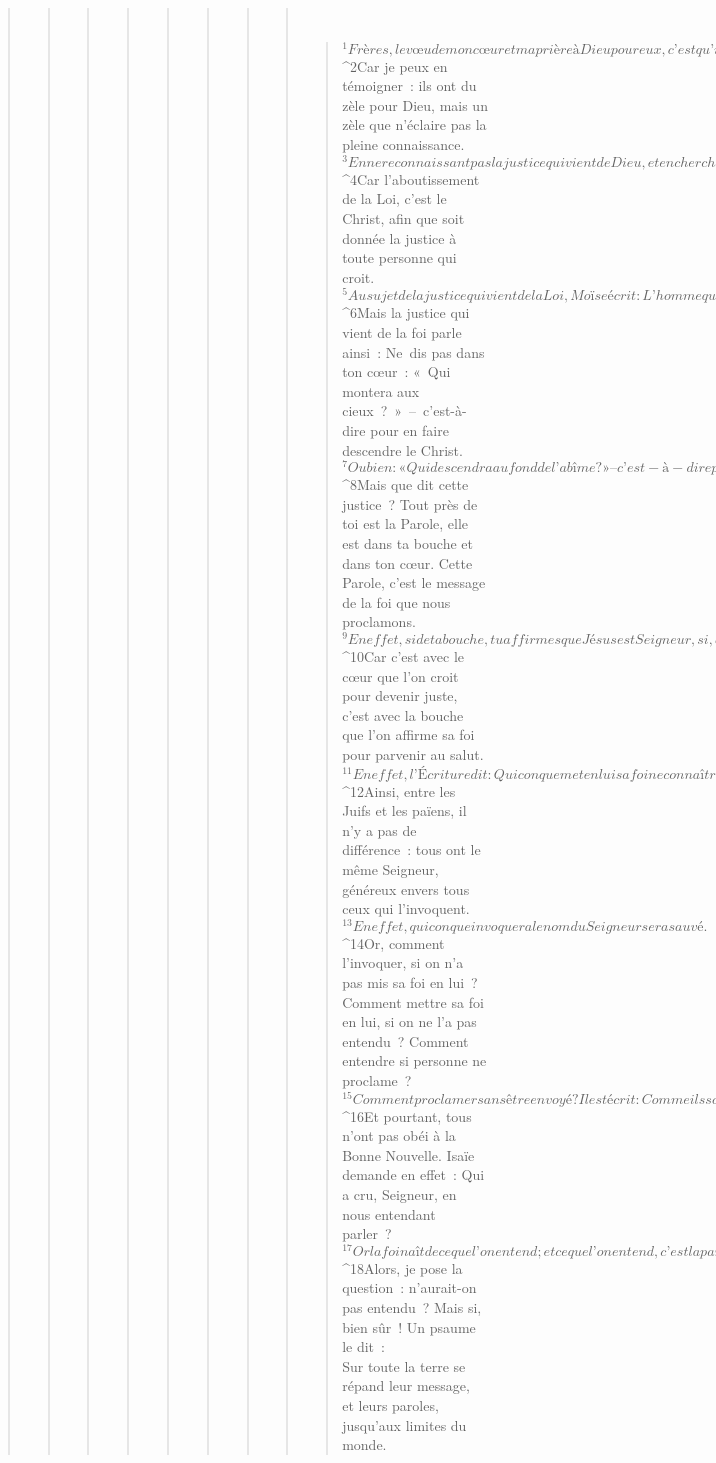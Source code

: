 \begin{verse}
\begin{verse}
\begin{verse}
\begin{verse}
\begin{verse}
\begin{verse}
\begin{verse}
\begin{verse}
         
      \bchapter{}
      \begin{verse}
${}^{1}Frères, le vœu de mon cœur et ma prière à Dieu pour eux, c’est qu’ils obtiennent le salut. 
${}^{2}Car je peux en témoigner : ils ont du zèle pour Dieu, mais un zèle que n’éclaire pas la pleine connaissance. 
${}^{3}En ne reconnaissant pas la justice qui vient de Dieu, et en cherchant à instaurer leur propre justice, ils ne se sont pas soumis à la justice de Dieu. 
${}^{4}Car l’aboutissement de la Loi, c’est le Christ, afin que soit donnée la justice à toute personne qui croit. 
${}^{5}Au sujet de la justice qui vient de la Loi, Moïse écrit : L’homme qui mettra les commandements en pratique y trouvera la vie.
${}^{6}Mais la justice qui vient de la foi parle ainsi : Ne dis pas dans ton cœur : « Qui montera aux cieux ? » – c’est-à-dire pour en faire descendre le Christ.
${}^{7}Ou bien : « Qui descendra au fond de l’abîme ? » – c’est-à-dire pour faire remonter le Christ d’entre les morts.
${}^{8}Mais que dit cette justice ? Tout près de toi est la Parole, elle est dans ta bouche et dans ton cœur. Cette Parole, c’est le message de la foi que nous proclamons.
${}^{9}En effet, si de ta bouche, tu affirmes que Jésus est Seigneur, si, dans ton cœur, tu crois que Dieu l’a ressuscité d’entre les morts, alors tu seras sauvé. 
${}^{10}Car c’est avec le cœur que l’on croit pour devenir juste, c’est avec la bouche que l’on affirme sa foi pour parvenir au salut. 
${}^{11}En effet, l’Écriture dit : Quiconque met en lui sa foi ne connaîtra pas la honte.
${}^{12}Ainsi, entre les Juifs et les païens, il n’y a pas de différence : tous ont le même Seigneur, généreux envers tous ceux qui l’invoquent. 
${}^{13}En effet, quiconque invoquera le nom du Seigneur sera sauvé.
${}^{14}Or, comment l’invoquer, si on n’a pas mis sa foi en lui ? Comment mettre sa foi en lui, si on ne l’a pas entendu ? Comment entendre si personne ne proclame ? 
${}^{15}Comment proclamer sans être envoyé ? Il est écrit : Comme ils sont beaux, les pas des messagers qui annoncent les bonnes nouvelles!
${}^{16}Et pourtant, tous n’ont pas obéi à la Bonne Nouvelle. Isaïe demande en effet : Qui a cru, Seigneur, en nous entendant parler ? 
${}^{17}Or la foi naît de ce que l’on entend ; et ce que l’on entend, c’est la parole du Christ. 
${}^{18}Alors, je pose la question : n’aurait-on pas entendu ? Mais si, bien sûr ! Un psaume le dit :
        \\Sur toute la terre se répand leur message,
        \\et leurs paroles, jusqu’aux limites du monde.

\end{verse}
\end{verse}
\end{verse}
\end{verse}
\end{verse}
\end{verse}
\end{verse}
\end{verse}
\end{verse}
